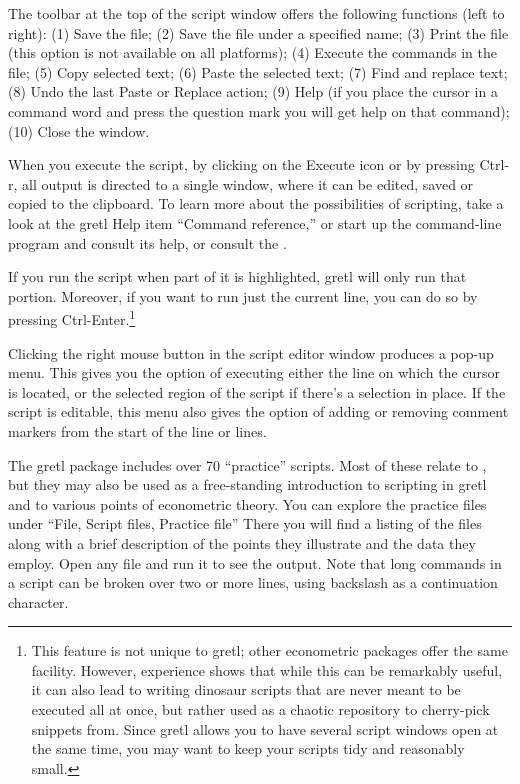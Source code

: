 The toolbar at the top of the script window offers the following
functions (left to right): (1) Save the file; (2) Save the file under
a specified name; (3) Print the file (this option is not available on
all platforms); (4) Execute the commands in the file; (5) Copy
selected text; (6) Paste the selected text; (7) Find and replace text;
(8) Undo the last Paste or Replace action; (9) Help (if you place the
cursor in a command word and press the question mark you will get help
on that command); (10) Close the window.

When you execute the script, by clicking on the Execute icon or by
pressing Ctrl-r, all output is directed to a single window, where it
can be edited, saved or copied to the clipboard.  To learn more about
the possibilities of scripting, take a look at the gretl Help
item ``Command reference,'' or start up the command-line program
 and consult its help, or consult the \GCR.

If you run the script when part of it is highlighted, gretl will
only run that portion. Moreover, if you want to run just the current
line, you can do so by pressing Ctrl-Enter.\footnote{This feature is
  not unique to gretl; other econometric packages offer the same
  facility. However, experience shows that while this can be
  remarkably useful, it can also lead to writing dinosaur scripts that
  are never meant to be executed all at once, but rather used as a
  chaotic repository to cherry-pick snippets from. Since gretl
  allows you to have several script windows open at the same time, you
  may want to keep your scripts tidy and reasonably small.}

Clicking the right mouse button in the script editor window produces a
pop-up menu.  This gives you the option of executing either the line
on which the cursor is located, or the selected region of the script
if there's a selection in place.  If the script is editable, this menu
also gives the option of adding or removing comment markers from the
start of the line or lines.

The gretl package includes over 70 ``practice'' scripts.  Most
of these relate to \cite{ramanathan02}, but they may also be used as a
free-standing introduction to scripting in gretl and to various
points of econometric theory.  You can explore the practice files
under ``File, Script files, Practice file'' There you will find a
listing of the files along with a brief description of the points they
illustrate and the data they employ.  Open any file and run it to see
the output.  Note that long commands in a script can be broken over
two or more lines, using backslash as a continuation character.

